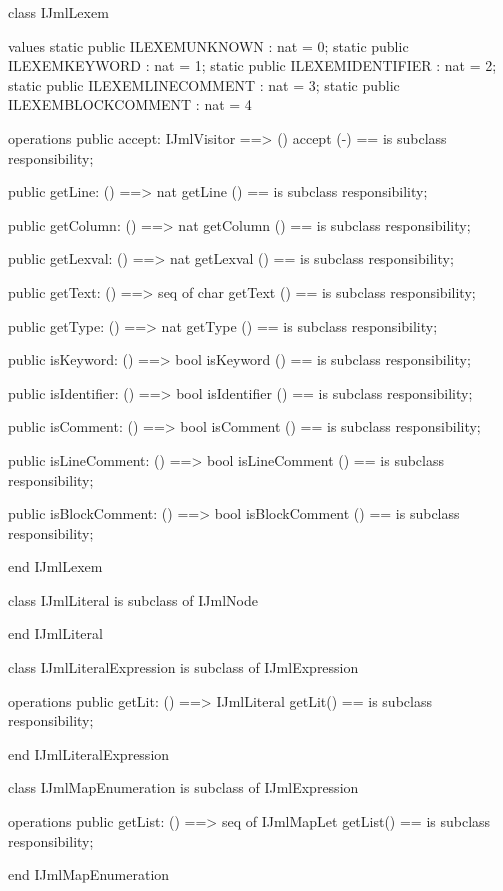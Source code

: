 \begin{vdm_al}
class IJmlLexem

values
  static public ILEXEMUNKNOWN      : nat = 0;
  static public ILEXEMKEYWORD      : nat = 1;
  static public ILEXEMIDENTIFIER   : nat = 2;
  static public ILEXEMLINECOMMENT  : nat = 3;
  static public ILEXEMBLOCKCOMMENT : nat = 4

operations
  public accept: IJmlVisitor ==> ()
  accept (-) == is subclass responsibility;

  public getLine: () ==> nat
  getLine () == is subclass responsibility;

  public getColumn: () ==> nat
  getColumn () == is subclass responsibility;

  public getLexval: () ==> nat
  getLexval () == is subclass responsibility;

  public getText: () ==> seq of char
  getText () == is subclass responsibility;

  public getType: () ==> nat
  getType () == is subclass responsibility;

  public isKeyword: () ==> bool
  isKeyword () == is subclass responsibility;

  public isIdentifier: () ==> bool
  isIdentifier () == is subclass responsibility;

  public isComment: () ==> bool
  isComment () == is subclass responsibility;

  public isLineComment: () ==> bool
  isLineComment () == is subclass responsibility;

  public isBlockComment: () ==> bool
  isBlockComment () == is subclass responsibility;

end IJmlLexem
\end{vdm_al}
\begin{vdm_al}
class IJmlLiteral
 is subclass of IJmlNode

end IJmlLiteral
\end{vdm_al}

\begin{vdm_al}
class IJmlLiteralExpression
 is subclass of IJmlExpression

operations
  public getLit: () ==> IJmlLiteral
  getLit() == is subclass responsibility;

end IJmlLiteralExpression
\end{vdm_al}

\begin{vdm_al}
class IJmlMapEnumeration
 is subclass of IJmlExpression

operations
  public getList: () ==> seq of IJmlMapLet
  getList() == is subclass responsibility;

end IJmlMapEnumeration
\end{vdm_al}

